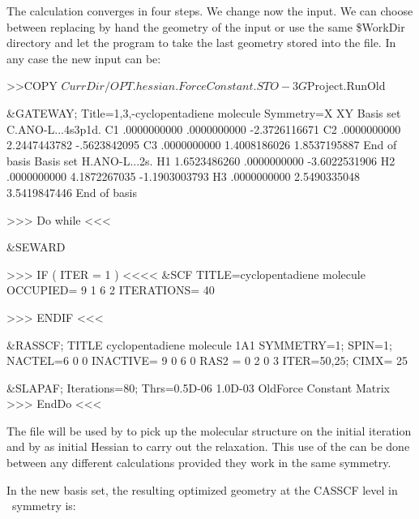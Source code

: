 The calculation converges in four steps. We change now the input. We can 
choose between replacing by hand the geometry of the  input
or use the same \$WorkDir directory and let the program to take the last
geometry stored into the  file. In any case the
new input can be:



\begin{inputlisting}

>>COPY  $CurrDir/OPT.hessian.ForceConstant.STO-3G $Project.RunOld

 &GATEWAY; Title=1,3,-cyclopentadiene molecule
Symmetry=X XY
Basis set
C.ANO-L...4s3p1d.
C1              .0000000000         .0000000000       -2.3726116671
C2              .0000000000        2.2447443782        -.5623842095
C3              .0000000000        1.4008186026        1.8537195887
End of basis
Basis set
H.ANO-L...2s.
H1             1.6523486260         .0000000000       -3.6022531906
H2              .0000000000        4.1872267035       -1.1903003793
H3              .0000000000        2.5490335048        3.5419847446
End of basis

>>> Do while <<<

 &SEWARD

>>> IF ( ITER = 1 ) <<<<
 &SCF
   TITLE=cyclopentadiene molecule
   OCCUPIED= 9 1 6 2
   ITERATIONS= 40

>>> ENDIF <<<

 &RASSCF; TITLE cyclopentadiene molecule 1A1
   SYMMETRY=1; SPIN=1; NACTEL=6    0    0
   INACTIVE= 9    0    6    0
   RAS2    = 0    2    0    3
   ITER=50,25; CIMX= 25

 &SLAPAF; Iterations=80; Thrs=0.5D-06 1.0D-03
   OldForce Constant Matrix
>>> EndDo <<<
\end{inputlisting}


The  file will be used by  to pick up 
the molecular structure on the initial iteration and 
by  as initial Hessian
to carry out the relaxation. This use of the  can be
done between any different calculations provided they work in the
same symmetry.

In the new basis set, the resulting
optimized geometry at the CASSCF level in \Ctv\ symmetry is:

